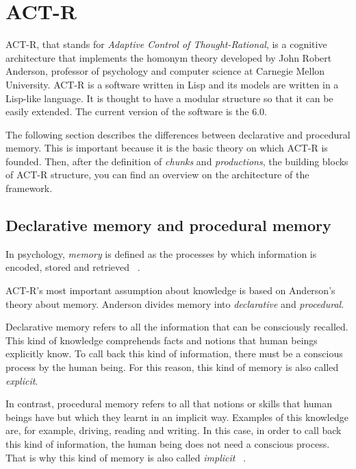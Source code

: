 	
  \section{ACT-R}
	\mbox{ACT-R}, that stands for \emph{Adaptive Control of Thought-Rational}, is a cognitive architecture that implements the homonym theory developed by John Robert Anderson, professor of psychology and computer science at Carnegie Mellon University. 
	\mbox{ACT-R} is a software written in Lisp and its models are written in a Lisp-like language. It is thought to have a modular structure so that it can be easily extended. The current version of the software is the 6.0. 
	
	The following section describes the differences between declarative and procedural memory. This is important because it is the basic theory on which ACT-R is founded. Then, after the definition of \emph{chunks} and \emph{productions}, the building blocks of ACT-R structure, you can find an overview on the architecture of the framework.
	
	\subsection{Declarative memory and procedural memory}
	In psychology, \emph{memory} is defined as the processes by which information is encoded, stored and retrieved ~\cite{baddeley2009memory}. 
	
	\mbox{ACT-R's} most important assumption about knowledge is based on Anderson's theory about memory. 
	Anderson divides memory into \emph{declarative} and \emph{procedural}. 
	
	Declarative memory refers to all the information that can be consciously recalled. This kind of knowledge comprehends facts and notions that human beings explicitly know. To call back this kind of information, there must be a conscious process by the human being. For this reason, this kind of memory is also called \emph{explicit}.
	
	In contrast, procedural memory refers to all that notions or skills that human beings have but which they learnt in an implicit way. Examples of this knowledge are, for example, driving, reading and writing. In this case, in order to call back this kind of information, the human being does not need a conscious process. That is why this kind of memory is also called \emph{implicit} ~\cite{anderson1976language}. 
	
